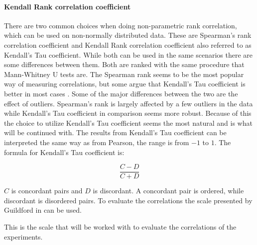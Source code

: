 \paragraph{Kendall Rank correlation coefficient}
There are two common choices when doing non-parametric rank correlation, which can be used on non-normally distributed data. These are Spearman's rank correlation coefficient and Kendall Rank correlation coefficient also referred to as Kendall's Tau coefficient\cite*[]{han1987non}. While both can be used in the same scenarios there are some differences between them. Both are ranked with the same procedure that Mann-Whitney U tests are. The Spearman rank seems to be the most popular way of measuring correlations, but some argue that Kendall's Tau coefficient is better in most cases \cite{gilpin1993table}. Some of the major differences between the two are the effect of outliers. Spearman's rank is largely affected by a few outliers in the data while Kendall's Tau coefficient in comparison seems more robust. Because of this the choice to utilize Kendall's Tau coefficient seems the most natural and is what will be continued with. The results from Kendall's Tau coefficient can be interpreted the same way as from Pearson, the range is from $-1$ to $1$. The formula for Kendall's Tau coefficient is:

\begin{equation}
    \frac{C-D}{C+D}
\end{equation}

$C$ is concordant pairs and $D$ is discordant. A concordant pair is ordered, while discordant is disordered pairs\cite{kendall1938new}. To evaluate the correlations the scale presented by Guildford in \cite[219]{guilford1950fundamental} can be used.



This is the scale that will be worked with to evaluate the correlations of the experiments.


